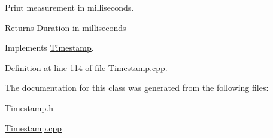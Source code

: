 Print measurement in milliseconds. 

\begin{DoxyReturn}{Returns}
Duration in milliseconds 
\end{DoxyReturn}


Implements \hyperlink{class_timestamp_a351537b95385937a004ab32b6b3743f7}{Timestamp}.



Definition at line 114 of file Timestamp.\+cpp.



The documentation for this class was generated from the following files\+:\begin{DoxyCompactItemize}
\item 
\hyperlink{_timestamp_8h}{Timestamp.\+h}\item 
\hyperlink{_timestamp_8cpp}{Timestamp.\+cpp}\end{DoxyCompactItemize}
